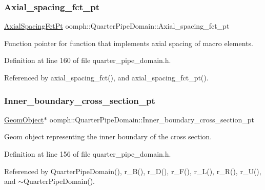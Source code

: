 \subsubsection{\texorpdfstring{Axial\+\_\+spacing\+\_\+fct\+\_\+pt}{Axial\_spacing\_fct\_pt}}
{\footnotesize\ttfamily \hyperlink{classoomph_1_1QuarterPipeDomain_a540d441b38146aacb12938d5f885789c}{Axial\+Spacing\+Fct\+Pt} oomph\+::\+Quarter\+Pipe\+Domain\+::\+Axial\+\_\+spacing\+\_\+fct\+\_\+pt\hspace{0.3cm}{\ttfamily [private]}}



Function pointer for function that implements axial spacing of macro elements. 



Definition at line 160 of file quarter\+\_\+pipe\+\_\+domain.\+h.



Referenced by axial\+\_\+spacing\+\_\+fct(), and axial\+\_\+spacing\+\_\+fct\+\_\+pt().

\mbox{\label{classoomph_1_1QuarterPipeDomain_a2760038e136d58a41dcbcd045bd13ae4}} 
\subsubsection{\texorpdfstring{Inner\+\_\+boundary\+\_\+cross\+\_\+section\+\_\+pt}{Inner\_boundary\_cross\_section\_pt}}
{\footnotesize\ttfamily \hyperlink{classoomph_1_1GeomObject}{Geom\+Object}$\ast$ oomph\+::\+Quarter\+Pipe\+Domain\+::\+Inner\+\_\+boundary\+\_\+cross\+\_\+section\+\_\+pt\hspace{0.3cm}{\ttfamily [private]}}



Geom object representing the inner boundary of the cross section. 



Definition at line 156 of file quarter\+\_\+pipe\+\_\+domain.\+h.



Referenced by Quarter\+Pipe\+Domain(), r\+\_\+\+B(), r\+\_\+\+D(), r\+\_\+\+F(), r\+\_\+\+L(), r\+\_\+\+R(), r\+\_\+\+U(), and $\sim$\+Quarter\+Pipe\+Domain().

